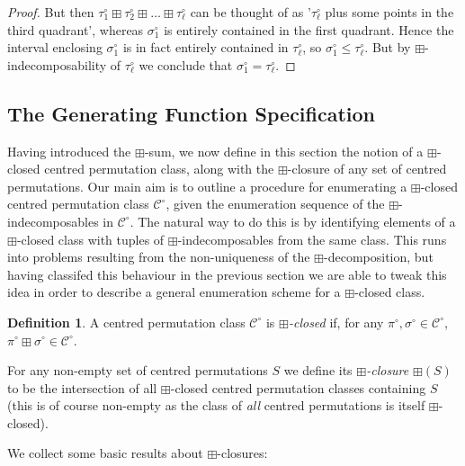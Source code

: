 \documentclass[11pt,a4paper]{article}
\theoremstyle{definition}
\newtheorem{defn}[thm]{Definition}
\begin{document}
\begin{proof}
But then $\tau_{1}^{\circ} \boxplus \tau_{2}^{\circ} \boxplus \dots \boxplus \tau_{\ell}^{\circ}$ can be thought of as '$\tau_{\ell}^{\circ}$ plus some points in the third quadrant', whereas $\sigma_{1}^{\circ}$ is entirely contained in the first quadrant. Hence the interval enclosing $\sigma_{1}^{\circ}$ is in fact entirely contained in $\tau_{\ell}^{\circ}$, so $\sigma_{1}^{\circ} \leq \tau_{\ell}^{\circ}$. But by $\boxplus$-indecomposability of $\tau_{\ell}^{\circ}$ we conclude that $\sigma_{1}^{\circ} = \tau_{\ell}^{\circ}$.\end{proof}

\subsection{The Generating Function Specification} \label{sec:2.3}

Having introduced the $\boxplus$-sum, we now define in this section the notion of a $\boxplus$-closed centred permutation class, along with the $\boxplus$-closure of any set of centred permutations. Our main aim is to outline a procedure for enumerating a $\boxplus$-closed centred permutation class $\mathcal{C}^{\circ}$, given the enumeration sequence of the $\boxplus$-indecomposables in $\mathcal{C}^{\circ}$. The natural way to do this is by identifying elements of a $\boxplus$-closed class with tuples of $\boxplus$-indecomposables from the same class. This runs into problems resulting from the non-uniqueness of the $\boxplus$-decomposition, but having classifed this behaviour in the previous section we are able to tweak this idea in order to describe a general enumeration scheme for a $\boxplus$-closed class.

\begin{defn} \label{def:boxclosed}
A centred permutation class $\mathcal{C}^{\circ}$ is \emph{$\boxplus$-closed} if, for any $\pi^{\circ},\sigma^{\circ} \in \mathcal{C}^{\circ}$, $\pi^{\circ} \boxplus \sigma^{\circ} \in \mathcal{C}^{\circ}$.

For any non-empty set of centred permutations $S$ we define its \emph{$\boxplus$-closure} $\boxplus(S)$ to be the intersection of all $\boxplus$-closed centred permutation classes containing $S$ (this is of course non-empty as the class of \emph{all} centred permutations is itself $\boxplus$-closed).
\end{defn}

We collect some basic results about $\boxplus$-closures:
\end{document}
